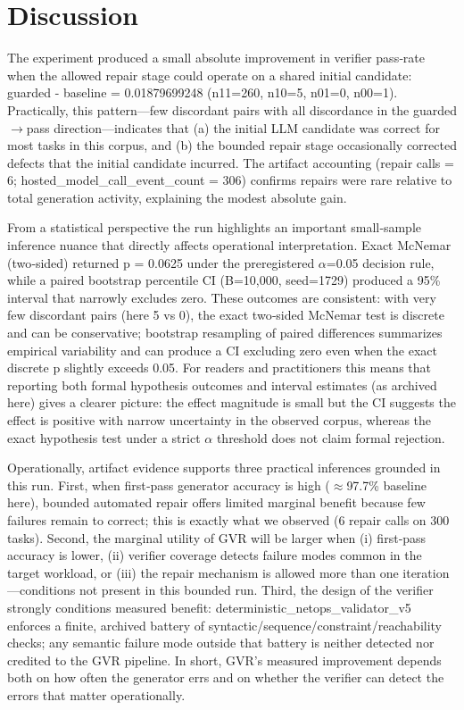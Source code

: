 \documentclass[conference]{IEEEtran}
\begin{document}
\section{Discussion}
The experiment produced a small absolute improvement in verifier pass‑rate when the allowed repair stage could operate on a shared initial candidate: guarded - baseline = 0.01879699248 (n11=260, n10=5, n01=0, n00=1). Practically, this pattern---few discordant pairs with all discordance in the guarded\ensuremath{\rightarrow}pass direction---indicates that (a) the initial LLM candidate was correct for most tasks in this corpus, and (b) the bounded repair stage occasionally corrected defects that the initial candidate incurred. The artifact accounting (repair calls = 6; hosted\_model\_call\_event\_count = 306) confirms repairs were rare relative to total generation activity, explaining the modest absolute gain.

From a statistical perspective the run highlights an important small‑sample inference nuance that directly affects operational interpretation. Exact McNemar (two‑sided) returned p = 0.0625 under the preregistered \ensuremath{\alpha}=0.05 decision rule, while a paired bootstrap percentile CI (B=10,000, seed=1729) produced a 95\% interval that narrowly excludes zero. These outcomes are consistent: with very few discordant pairs (here 5 vs 0), the exact two‑sided McNemar test is discrete and can be conservative; bootstrap resampling of paired differences summarizes empirical variability and can produce a CI excluding zero even when the exact discrete p slightly exceeds 0.05. For readers and practitioners this means that reporting both formal hypothesis outcomes and interval estimates (as archived here) gives a clearer picture: the effect magnitude is small but the CI suggests the effect is positive with narrow uncertainty in the observed corpus, whereas the exact hypothesis test under a strict \ensuremath{\alpha} threshold does not claim formal rejection.

Operationally, artifact evidence supports three practical inferences grounded in this run. First, when first‑pass generator accuracy is high (\ensuremath{\approx}97.7\% baseline here), bounded automated repair offers limited marginal benefit because few failures remain to correct; this is exactly what we observed (6 repair calls on 300 tasks). Second, the marginal utility of GVR will be larger when (i) first‑pass accuracy is lower, (ii) verifier coverage detects failure modes common in the target workload, or (iii) the repair mechanism is allowed more than one iteration---conditions not present in this bounded run. Third, the design of the verifier strongly conditions measured benefit: deterministic\_netops\_validator\_v5 enforces a finite, archived battery of syntactic/sequence/constraint/reachability checks; any semantic failure mode outside that battery is neither detected nor credited to the GVR pipeline. In short, GVR's measured improvement depends both on how often the generator errs and on whether the verifier can detect the errors that matter operationally.
\end{document}
